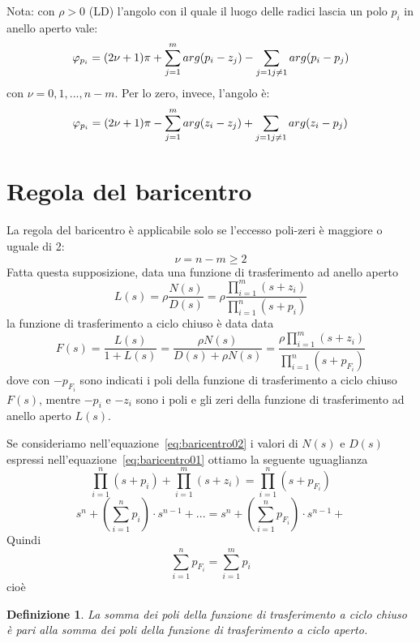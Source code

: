 \documentclass[a4paper]{report}
\newtheorem{definizione}{Definizione}
\begin{document}
Nota: con $\rho > 0$ (LD) l'angolo con il quale il luogo delle radici
lascia un polo $p_i$ in anello aperto vale:
\[
 \varphi_{p_i} = (2 \nu +1)\pi + \sum\limits_{j = 1}^{m} arg(p_i -
 z_j) - \sum\limits_{j = 1\\j\neq 1} arg(p_i - p_j)
\]
con $\nu = 0, 1, ... , n-m$.
Per lo zero, invece, l'angolo \`e:
\[
 \varphi_{p_i} = (2 \nu +1)\pi - \sum\limits_{j = 1}^{m} arg(z_i -
 z_j) + \sum\limits_{j = 1\\j\neq 1} arg(z_i - p_j)
\]

\section{Regola del baricentro}
La regola del baricentro \`e applicabile solo se l'eccesso poli-zeri
\`e maggiore o uguale di 2:
\[
\nu = n - m \geq 2
\]
Fatta questa supposizione, data una funzione di trasferimento ad
anello aperto 
\begin{equation}\label{eq:baricentro01}
L(s) = \rho \dfrac{N(s)}{D(s)} = \rho \dfrac{\prod\limits_{i =
    1}^{m} (s + z_i)}{\prod\limits_{i = 1}^{n} (s + p_i)}
\end{equation}
la funzione di trasferimento a ciclo chiuso \`e data data
\begin{equation}\label{eq:baricentro02}
F(s) = \dfrac{L(s)}{1 + L(s)} = \dfrac{\rho N(s)}{D(s) + \rho N(s)} =
\dfrac{\rho \prod\limits_{i = 1}^{m} (s + z_i)}{\prod\limits_{i =
    1}^{n} (s + p_{F_i})}
\end{equation}
dove con $-p_{F_i}$ sono indicati i poli della funzione di
trasferimento a ciclo chiuso $F(s)$, mentre $-p_i$ e $-z_i$ sono i
poli e gli zeri della funzione di trasferimento ad anello aperto
$L(s)$. 

Se consideriamo nell'equazione~\ref{eq:baricentro02} i valori di $N(s)$
e $D(s)$ espressi nell'equazione~\ref{eq:baricentro01} ottiamo la
seguente uguaglianza
\begin{equation}\label{eq:baricentro03}
  \prod\limits_{i = 1}^{n} (s + p_i) + \prod\limits_{i = 1}^{m} (s +
  z_i) = \prod\limits_{i = 1}^{n} (s + p_{F_i})
\end{equation}
\[
s^n + \left( \sum\limits_{i = 1}^{n} p_i \right)\cdot s^{n - 1} + 
... = s^n + \left( \sum\limits_{i = 1}^{n} p_{F_i} \right)\cdot s^{n - 1} +
\]
Quindi
\[
\sum\limits_{i = 1}^{n} p_{F_i} = \sum\limits_{i = 1}^{m} p_i
\]
cio\`e
\begin{definizione}
  La somma dei poli della funzione di trasferimento a ciclo chiuso
  \`e pari alla somma dei poli della funzione di trasferimento a ciclo
  aperto.
\end{definizione}
\end{document}
